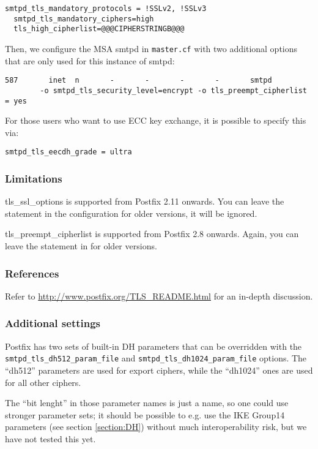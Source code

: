 \begin{lstlisting}[breaklines]
  smtpd_tls_mandatory_protocols = !SSLv2, !SSLv3
  smtpd_tls_mandatory_ciphers=high
  tls_high_cipherlist=@@@CIPHERSTRINGB@@@
\end{lstlisting}

Then, we configure the MSA smtpd in \verb|master.cf| with two
additional options that are only used for this instance of smtpd:

\begin{lstlisting}[breaklines]
587       inet  n       -       -       -       -       smtpd 
        -o smtpd_tls_security_level=encrypt -o tls_preempt_cipherlist = yes
\end{lstlisting}

For those users who want to use ECC key exchange, it is possible to specify this via:
\begin{lstlisting}[breaklines]
  smtpd_tls_eecdh_grade = ultra
\end{lstlisting}

\subsubsection{Limitations}

tls\_ssl\_options is supported from Postfix 2.11 onwards. You can
leave the statement in the configuration for older versions, it will
be ignored.

tls\_preempt\_cipherlist is supported from Postfix 2.8 onwards. Again,
you can leave the statement in for older versions.

\subsubsection{References}

Refer to \url{http://www.postfix.org/TLS_README.html} for an in-depth
discussion.

\subsubsection{Additional settings}

Postfix has two sets of built-in DH parameters that can be overridden
with the \verb|smtpd_tls_dh512_param_file|
and \verb|smtpd_tls_dh1024_param_file| options. The ``dh512''
parameters are used for export ciphers, while the ``dh1024'' ones are
used for all other ciphers.

The ``bit lenght'' in those parameter names is just a name, so one
could use stronger parameter sets; it should be possible to e.g. use the
IKE Group14 parameters (see section \ref{section:DH}) without much
interoperability risk, but we have not tested this yet.

